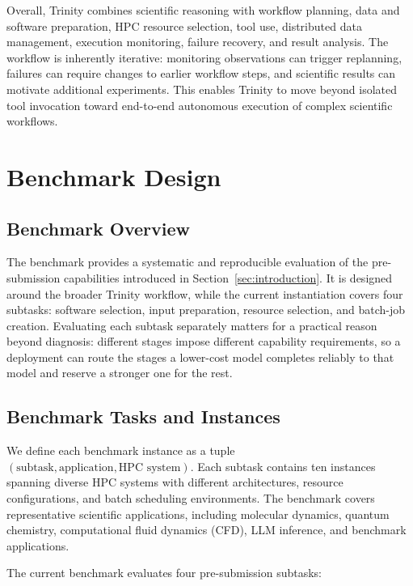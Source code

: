 \documentclass[conference]{IEEEtran}
\begin{document}
Overall, Trinity combines scientific reasoning with workflow
planning, data and software preparation, HPC resource selection,
tool use, distributed data management, execution monitoring,
failure recovery, and result analysis. The workflow is inherently
iterative: monitoring observations can trigger replanning,
failures can require changes to earlier workflow steps, and
scientific results can motivate additional experiments. This
enables Trinity to move beyond isolated tool invocation toward
end-to-end autonomous execution of complex scientific workflows.



\section{Benchmark Design}\label{sec:benchmark}

\subsection{Benchmark Overview}

The benchmark provides a systematic and reproducible evaluation of the pre-submission capabilities introduced in Section~\ref{sec:introduction}. It is designed around the broader Trinity workflow, while the current instantiation covers four subtasks: software selection, input preparation, resource selection, and batch-job creation. Evaluating each subtask separately matters for a practical reason beyond diagnosis: different stages impose different capability requirements, so a deployment can route the stages a lower-cost model completes reliably to that model and reserve a stronger one for the rest.

\subsection{Benchmark Tasks and Instances}

We define each benchmark instance as a tuple $(\text{subtask}, \text{application}, \text{HPC system})$. Each subtask contains ten instances spanning diverse HPC systems with different architectures, resource configurations, and batch scheduling environments. The benchmark covers representative scientific applications, including molecular dynamics, quantum chemistry, computational fluid dynamics (CFD), LLM inference, and benchmark applications.

The current benchmark evaluates four pre-submission subtasks:
\end{document}
